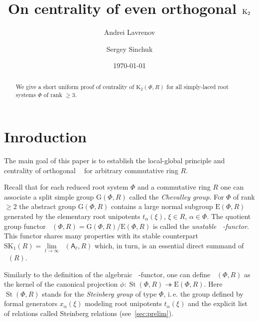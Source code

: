 \documentclass[11pt]{amsart}
\title{On centrality of even orthogonal $\Kt$}
\author {Andrei Lavrenov}
\author{Sergey Sinchuk}
\date {\today}
\theoremstyle{plain} \declaretheorem[name=Theorem, Refname={Theorem,Theorems}]{tm} \Crefname{tm}{Theorem}{Theorems}
\numberwithin{equation}{section}
\theoremstyle{definition} \newtheorem{df}[lm]{Definition} \Crefname{df}{Definition}{Definitions}
\theoremstyle{remark} \newtheorem{rk}[lm]{Remark} \Crefname{rk}{Remark}{Remarks}
\newcommand{\E}{{\mathrm{E}}}
\newcommand{\GG}{{\mathrm{G}}}
\newcommand{\St}{\mathop{\mathrm{St}}\nolimits}
\newcommand{\Kt}{\mathop{\mathrm{K_2}}\nolimits}
\newcommand{\Ko}{\mathop{\mathrm{K_1}}\nolimits}
\newcommand{\rA}{\mathsf{A}}
\begin{document}
\begin{abstract} We give a short uniform proof of centrality of $\mathrm K_2(\Phi, R)$ for all simply-laced root systems $\Phi$ of rank $\geq 3$.
\end{abstract}

\maketitle


\section*{Inroduction}
The main goal of this paper is to establish the local-global principle and centrality of orthogonal $\Kt$ for arbitrary commutative ring $R$.

Recall that for each reduced root system $\Phi$ and a commutative ring $R$ one can associate a split simple group $\GG(\Phi, R)$ called the \emph{Chevalley group}.
For $\Phi$ of rank $\geq 2$ the abstract group $\GG(\Phi, R)$ contains a large normal subgroup $\E(\Phi, R)$ generated by the elementary root unipotents $t_\alpha(\xi)$, $\xi\in R$, $\alpha\in \Phi$.
The quotient group functor $\Ko(\Phi, R)=\GG(\Phi, R)/\E(\Phi, R)$ is called the \emph{unstable $\Ko$-functor}.
This functor shares many properties with its stable counterpart $\mathrm{SK}_1(R) = \lim\limits_{l\to\infty}\Ko(\rA_\ell, R)$ which, in turn, is an essential direct summand of $\Ko(R)$.

Similarly to the definition of the algebraic $\Kt$-functor, one can define $\Kt(\Phi, R)$ as the kernel of the canonical projection $\phi\colon\St(\Phi, R)\twoheadrightarrow \E(\Phi, R)$.
Here $\St(\Phi, R)$ stands for the \emph{Steinberg group} of type $\Phi$, i.\,e. the group defined by formal generators $x_\alpha(\xi)$ modeling root unipotents $t_\alpha(\xi)$
and the explicit list of relations called Steinberg relations (see~\cref{sec:prelim}). 
\end{document}
